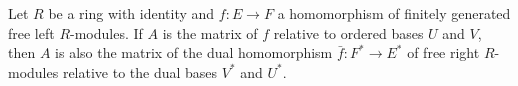 Let $R$ be a ring with identity and $f: E \to F$ a homomorphism of finitely generated free left $R$-modules. If $A$ is the matrix of $f$ relative to ordered bases $U$ and $V$, then $A$ is also the matrix of the dual homomorphism $\bar{f}: F^* \to E^*$ of free right $R$-modules relative to the dual bases $V^*$ and $U^*$.
